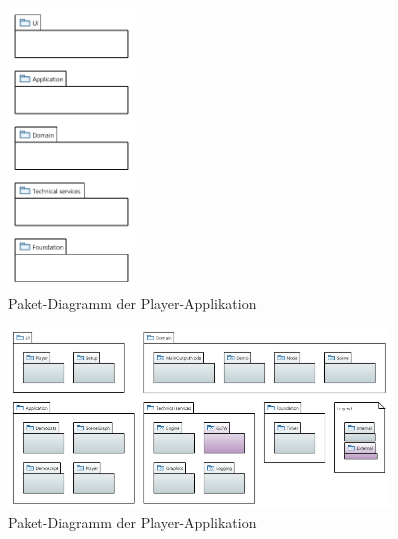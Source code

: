 \begin{figure}[H]
    \centering
    \includegraphics[width=0.3\textwidth]{img/layers.PDF}
    \caption{Paket-Diagramm der
        Player-Applikation}\label{fig:package-diagram:layers}
\end{figure}

\begin{figure}[H]
    \centering
    \includegraphics[width=0.9\textwidth]{img/player_package_diagram.PNG}
    \caption{Paket-Diagramm der Player-Applikation}\label{fig:package-diagram:player}
\end{figure}

